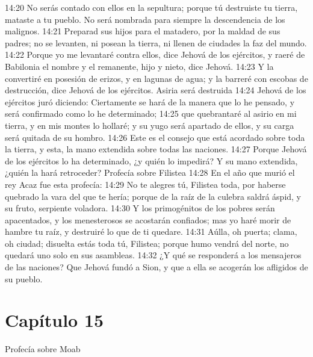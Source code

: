 14:20 No serás contado con ellos en la sepultura; porque tú destruiste tu tierra, mataste a tu pueblo. No será nombrada para siempre la descendencia de los malignos. 
14:21 Preparad sus hijos para el matadero, por la maldad de sus padres; no se levanten, ni posean la tierra, ni llenen de ciudades la faz del mundo. 
14:22 Porque yo me levantaré contra ellos, dice Jehová de los ejércitos, y raeré de Babilonia el nombre y el remanente, hijo y nieto, dice Jehová. 
14:23 Y la convertiré en posesión de erizos, y en lagunas de agua; y la barreré con escobas de destrucción, dice Jehová de los ejércitos. 
Asiria será destruida 
14:24 Jehová de los ejércitos juró diciendo: Ciertamente se hará de la manera que lo he pensado, y será confirmado como lo he determinado; 
14:25 que quebrantaré al asirio en mi tierra, y en mis montes lo hollaré; y su yugo será apartado de ellos, y su carga será quitada de su hombro. 
14:26 Este es el consejo que está acordado sobre toda la tierra, y esta, la mano extendida sobre todas las naciones. 
14:27 Porque Jehová de los ejércitos lo ha determinado, ¿y quién lo impedirá? Y su mano extendida, ¿quién la hará retroceder? 
Profecía sobre Filistea 
14:28 En el año que murió el rey Acaz fue esta profecía: 
14:29 No te alegres tú, Filistea toda, por haberse quebrado la vara del que te hería; porque de la raíz de la culebra saldrá áspid, y su fruto, serpiente voladora. 
14:30 Y los primogénitos de los pobres serán apacentados, y los menesterosos se acostarán confiados; mas yo haré morir de hambre tu raíz, y destruiré lo que de ti quedare. 
14:31 Aúlla, oh puerta; clama, oh ciudad; disuelta estás toda tú, Filistea; porque humo vendrá del norte, no quedará uno solo en sus asambleas. 
14:32 ¿Y qué se responderá a los mensajeros de las naciones? Que Jehová fundó a Sion, y que a ella se acogerán los afligidos de su pueblo. 
\section*{Capítulo 15}
Profecía sobre Moab 
 
